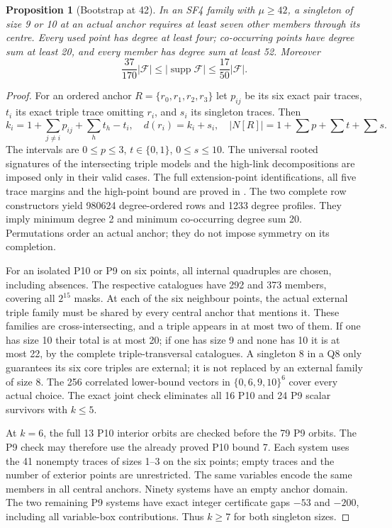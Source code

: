 \documentclass[11pt,a4paper]{article}
\numberwithin{equation}{section}
\newtheorem{proposition}[theorem]{Proposition}
\theoremstyle{remark}
\newcommand{\F}{\mathcal F}
\begin{document}
\begin{proposition}[Bootstrap at 42]\label{prop:bootstrap42}
In an SF4 family with $\mu\ge 42$, a singleton of size 9 or 10 at an actual
anchor requires at least seven other members through its centre.
Every used point has degree at least four; co-occurring points have
degree sum at least 20, and every member has degree sum at least 52.
Moreover
\[
 \frac{37}{170}|\F|\le |\operatorname{supp}\F|
 \le\frac{17}{50}|\F|.
\]
\end{proposition}
\begin{proof}
For an ordered anchor $ R=\{r_0,r_1,r_2,r_3\}$ let $ p_{ij}$ be its six
exact pair traces, $ t_i $ its exact triple trace omitting $ r_i $, and $ s_i $
its singleton traces. Then
\[
 k_i=1+\sum_{j\ne i}p_{ij}+\sum_h t_h-t_i,\quad d(r_i)=k_i+s_i,\quad
 |N[R]|=1+\sum p+\sum t+\sum s.
\]
The intervals are $0\le p\le 3$, $ t\in\{0,1\}$, $0\le s\le 10$.
The universal rooted signatures of the intersecting triple models and
the high-link decompositions are imposed only in their valid cases.
The full extension-point identifications, all five trace margins and the
high-point bound are proved in
.
The two complete row constructors yield 980624 degree-ordered rows and
1233 degree profiles. They imply minimum degree 2 and minimum co-occurring
degree sum 20. Permutations order an actual anchor; they do not impose
symmetry on its completion.

For an isolated P10 or P9 on six points, all internal quadruples are
chosen, including absences. The respective catalogues have 292 and 373
members, covering all $2^{15}$ masks. At each of the six neighbour
points, the actual external triple family must be shared by every
central anchor that mentions it. These families are cross-intersecting,
and a triple appears in at most two of them. If one has size 10 their
total is at most 20; if one has size 9 and none has 10 it is at most 22,
by the complete triple-transversal catalogues. A singleton 8 in a Q8
only guarantees its six core triples are external; it is not replaced
by an external family of size 8.
The 256 correlated lower-bound vectors in $\{0,6,9,10\}^6$ cover every
actual choice. The exact joint check eliminates all 16 P10 and 24 P9
scalar survivors with $ k\le 5$.

At $ k=6$, the full 13 P10 interior orbits are checked before the 79 P9
orbits. The P9 check may therefore use the already proved P10 bound 7.
Each system uses the 41 nonempty traces of sizes 1--3 on the six points;
empty traces and the number of exterior points are unrestricted.
The same variables encode the same members in all central anchors.
Ninety systems have an empty anchor domain. The two remaining P9 systems
have exact integer certificate gaps $-53$ and $-200$, including all
variable-box contributions. Thus $ k\ge 7$ for both singleton sizes.


\end{proof}
\end{document}
